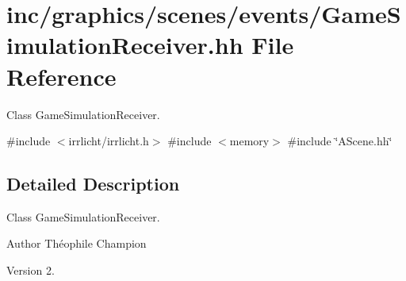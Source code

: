 \hypertarget{GameSimulationReceiver_8hh}{}\section{inc/graphics/scenes/events/\+Game\+Simulation\+Receiver.hh File Reference}
\label{GameSimulationReceiver_8hh}


Class Game\+Simulation\+Receiver.  


{\ttfamily \#include $<$irrlicht/irrlicht.\+h$>$}\newline
{\ttfamily \#include $<$memory$>$}\newline
{\ttfamily \#include \char`\"{}A\+Scene.\+hh\char`\"{}}\newline


\subsection{Detailed Description}
Class Game\+Simulation\+Receiver. 

\begin{DoxyAuthor}{Author}
Théophile Champion 
\end{DoxyAuthor}
\begin{DoxyVersion}{Version}
2. 
\end{DoxyVersion}
